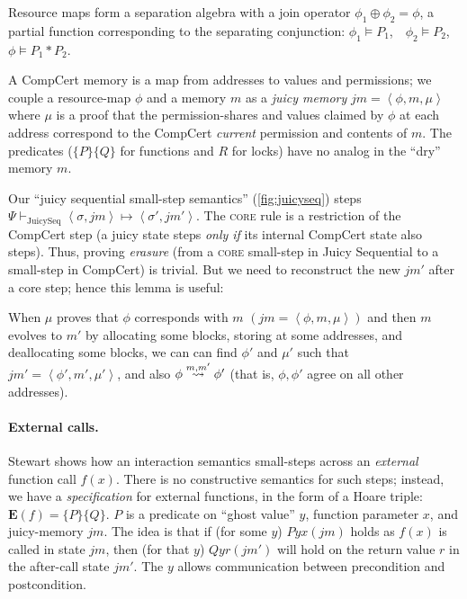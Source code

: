 Resource maps form a separation algebra
with a join operator $\phi_1 \oplus \phi_2 = \phi$,
a partial function
corresponding to the separating conjunction:
$\phi_1 \models P_1$,\ \ $\phi_2 \models P_2$, \ $\phi \models P_1 * P_2$.

A CompCert memory is a map from addresses to values and permissions;
we couple a resource-map $\phi$ and a memory $m$
as a \emph{juicy memory} $\mathit{jm}=\left<\phi,m,\mu\right>$
where $\mu$ is a proof that the permission-shares and values claimed
by $\phi$ at each address correspond to the CompCert \emph{current}
permission and contents of $m$.
The predicates ($\{P\}\{Q\}$ for functions and $R$ for locks)
have no analog in the ``dry'' memory $m$.

Our ``juicy sequential small-step semantics'' (\autoref{fig:juicyseq})
steps $\Psi \vdash_\mathrm{JuicySeq} \left<\sigma,\mathit{jm}\right>
\mapsto \left<\sigma',\mathit{jm}'\right>$.
The \textsc{core} rule is a restriction of the
CompCert step (a juicy state steps \emph{only if} its
internal CompCert state also steps).
Thus, proving \emph{erasure} (from a \textsc{core} small-step
in Juicy Sequential to a small-step in CompCert) is trivial.
But we need to reconstruct the new $\mathit{jm'}$ after
a core step; hence this lemma is useful:

\begin{lemma}
\label{lemma:chap42}
When $\mu$ proves that $\phi$ corresponds with $m$
$(\mathit{jm}=\left<\phi,m,\mu\right>)$
and then $m$ evolves to $m'$ by 
allocating some blocks, storing at some addresses, and deallocating some blocks,
we can can find $\phi'$ and $\mu'$ such that 
$\mathit{jm'}=\left<\phi',m',\mu'\right>$,
and also $\phi \stackrel{m,m'}{\leadsto} \phi'$ (that is,
$\phi,\phi'$ agree on all other addresses).
\end{lemma}


\paragraph{External calls.}
Stewart \cite[page 119]{stewart15:phd} shows how an interaction
semantics small-steps across an \emph{external} function
call $f(x)$.  There is no constructive semantics for such steps;
instead, we have a \emph{specification} for external functions,
in the form of a Hoare triple: $\mathbf{E}(f)=
\{P\}\{Q\}$.
$P$ is a predicate on ``ghost value'' $y$, function parameter $x$,
and juicy-memory $\mathit{jm}$.
The idea is that if (for some $y$) $Pyx(\mathit{jm})$ holds
as $f(x)$ is called in state $\mathit{jm}$, then (for that $y$) $Qyr
(\mathit{jm}')$ will hold on the return value $r$ in the after-call state
$\mathit{jm}'$.  The $y$ allows communication between
precondition and postcondition.


